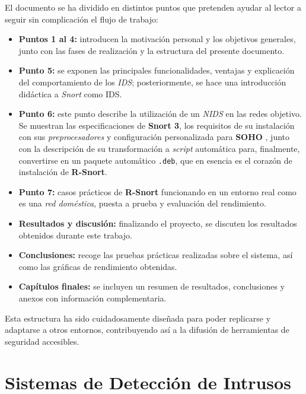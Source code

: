 \documentclass[12pt,a4paper]{report}
\begin{document}
El documento se ha dividido en distintos puntos que pretenden ayudar al lector a seguir sin complicación el flujo de trabajo:

\begin{itemize}
	\item \textbf{Puntos 1 al 4:} introducen la motivación personal y los objetivos generales, junto con las fases de realización y la estructura del presente documento.
	
	\item \textbf{Punto 5:} se exponen las principales funcionalidades, ventajas y explicación del comportamiento de los \textit{IDS}; posteriormente, se hace una introducción didáctica a \textit{Snort} como IDS.
	
	\item \textbf{Punto 6:} este punto describe la utilización de un \textit{NIDS} en las redes objetivo. Se muestran las especificaciones de \textbf{Snort 3}, los requisitos de su instalación con sus \textit{preprocesadores} y configuración personalizada para \textbf{SOHO} \cite{cocsar2017firewall}, junto con la descripción de su transformación a \textit{script} automática para, finalmente, convertirse en un paquete automático \texttt{.deb}, que en esencia es el corazón de instalación de \textbf{R-Snort}.
	
	\item \textbf{Punto 7:} casos prácticos de \textbf{R-Snort} funcionando en un entorno real como es una \textit{red doméstica}, puesta a prueba y evaluación del rendimiento.
	
	\item \textbf{Resultados y discusión:} finalizando el proyecto, se discuten los resultados obtenidos durante este trabajo.
	
	\item \textbf{Conclusiones:} recoge las pruebas prácticas realizadas sobre el sistema, así como las gráficas de rendimiento obtenidas.
	
	\item \textbf{Capítulos finales:} se incluyen un resumen de resultados, conclusiones y anexos con información complementaria.
\end{itemize}

Esta estructura ha sido cuidadosamente diseñada para poder replicarse y adaptarse a otros entornos, contribuyendo así a la difusión de herramientas de seguridad accesibles.



\chapter{Sistemas de Detección de Intrusos}
\end{document}
